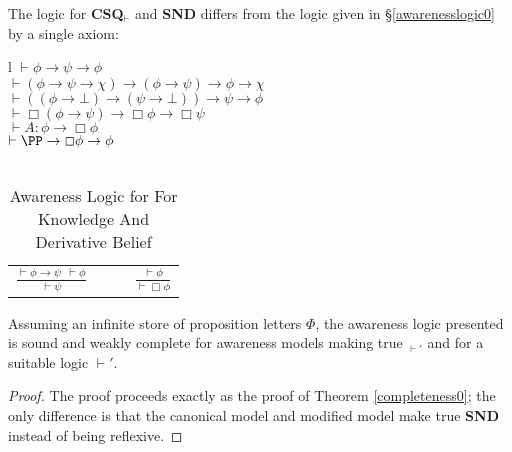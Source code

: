 The logic for \textbf{CSQ$_\vdash$} and \textbf{SND} differs from the
logic given in \S\ref{awarenesslogic0} by a single axiom:

\begin{table}[h]
\begin{centering}
  \begin{tabular}{l}
    $\vdash \phi \rightarrow \psi \rightarrow \phi$\\
    $\vdash (\phi \rightarrow \psi \rightarrow \chi) \rightarrow (\phi
    \rightarrow \psi) \rightarrow \phi \rightarrow \chi$\\
    $\vdash ((\phi \rightarrow \bot) \rightarrow (\psi \rightarrow \bot))
    \rightarrow \psi \rightarrow \phi$\\
    $\vdash \Box(\phi \rightarrow \psi) \rightarrow \Box \phi \rightarrow \Box
    \psi$\\
    $\vdash A : \phi \rightarrow \Box \phi$\\
    $\vdash \PP \to \Box \phi \rightarrow \phi$\\
    \\
    \begin{tabular}{lll}
      $\displaystyle \frac{\vdash \phi \rightarrow \psi \ \  \vdash \phi}{\vdash
      \psi}$ & {\ \ } & $\displaystyle \frac{\vdash \phi}{\vdash \Box \phi}$
    \end{tabular}
  \end{tabular}
  \caption{\label{logic1}Awareness Logic for For Knowledge And
    Derivative Belief}
\end{centering}
\end{table}

\begin{theorem}
  \label{completeness1}Assuming an infinite store of proposition letters
  $\Phi$, the awareness logic presented is sound and weakly complete for
  awareness models making true $_{\vdash'}$ and
   for a suitable logic $\vdash'$.
\end{theorem}
\begin{proof}
The proof proceeds exactly as the proof of Theorem
\ref{completeness0}; the only difference is that the canonical model
and modified model make true \textbf{SND} instead of being reflexive.
\end{proof}

